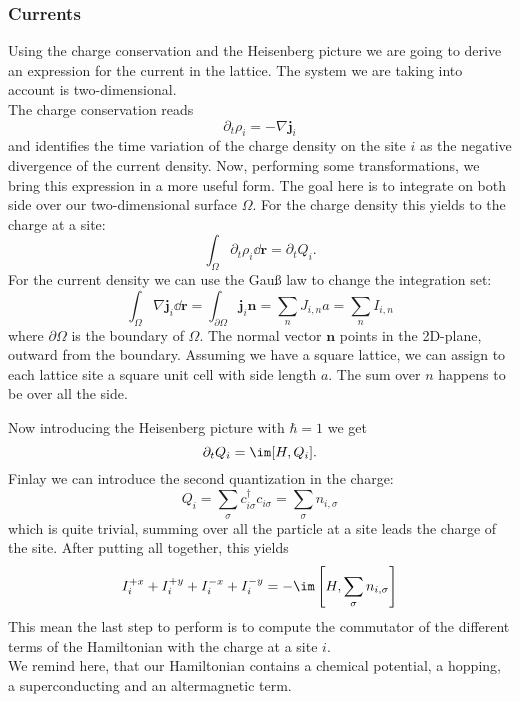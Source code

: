 \documentclass[../main.tex]{subfile}
\begin{document}
\subsubsection{Currents}
Using the charge conservation and the Heisenberg picture we are going to derive an expression
for the current in the lattice. The system we are taking into account is two-dimensional.\\

The charge conservation reads
\[
    \partial_t \rho_i = - \nabla \bm{j}_i
\]
and identifies the time variation of the charge density on the site $i$ as the negative divergence of the current density.
Now, performing some transformations, we bring this expression in a more useful form. The goal here is to integrate on both 
side over our two-dimensional surface $\Omega$. For the charge density this yields to the charge at a site:
\[
    \int_{\Omega} \partial_t \rho_i \dd \bm{r} = \partial_t Q_i .
\]
For the current density we can use the Gauß law to change the integration set:
\[
    \int_{\Omega} \nabla \bm{j}_i \dd \bm{r} = \int_{\partial \Omega} \bm{j}_i \bm{n} = \sum_{n} J_{i,n} a = \sum_{n} I_{i,n}
\]
where $\partial \Omega$ is the boundary of $\Omega$. The normal vector $\bm{n}$ points in the 2D-plane, outward from the boundary.
Assuming we have a square lattice, we can assign to each lattice site a square
unit cell with side length $a$. The sum over $n$ happens to be over all the side.

Now introducing the Heisenberg picture with $\hbar = 1$ we get
\[
    \partial_t Q_i = \im [H, Q_i].
\]
Finlay we can introduce the second quantization in the charge:
\[
    Q_i = \sum_{\sigma} c_{i\sigma}^{\dagger}  c_{i\sigma} = \sum_{\sigma} n_{i,\sigma}
\]
which is quite trivial, summing over all the particle at a site leads the charge of the site. After putting all together, this yields
\begin{equation}\label{eq:CurrentSidesCommutator}
 I_{i}^{+x} +  I_{i}^{+y} +  I_{i}^{-x} +  I_{i}^{-y} = -\im \left[H, \sum_{\sigma} n_{i,\sigma}\right]
\end{equation}
This mean the last step to perform is to compute the commutator of the different terms of the Hamiltonian with the charge at a site $i$.\\
We remind here, that our Hamiltonian contains a chemical potential, a hopping, a superconducting and an altermagnetic term.
\end{document}
